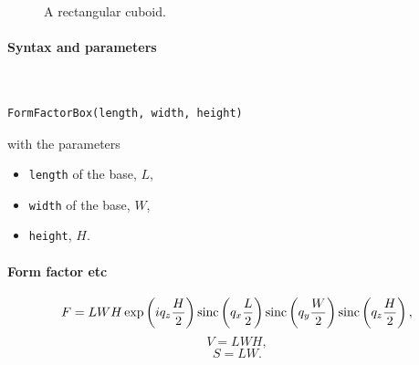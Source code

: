 \begin{figure}[H]
\hfill
{}
\hfill
{}
\hfill
{}
\hfill
\caption{A rectangular cuboid.}
\end{figure}

\FloatBarrier

\paragraph{Syntax and parameters}\strut\\[-2ex plus .2ex minus .2ex]
\begin{lstlisting}[language=python, style=eclipseboxed,numbers=none,nolol]
  FormFactorBox(length, width, height)
\end{lstlisting}
with the parameters
\begin{itemize}
\item \texttt{length} of the base, $L$,
\item \texttt{width} of the base, $W$,
\item \texttt{height}, $H$.
\end{itemize}


\paragraph{Form factor etc}

\begin{equation*}
F= L W H\exp\left(i q_z \frac{H}{2}\right) \operatorname{sinc}\left(q_x \frac{L}{2}\right)
\operatorname{sinc}\left(q_y \frac{W}{2}\right) \operatorname{sinc}\left(q_z \frac{H}{2}\right),
\end{equation*}
\begin{equation*}
  V= LWH,
\end{equation*}
\begin{equation*}
  S = LW.
\end{equation*}

